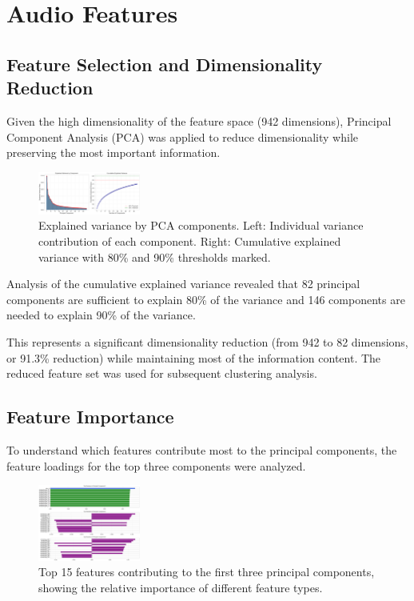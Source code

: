 \documentclass{article}
\begin{document}
\section{Audio Features}
\label{sec:audio_features}

\subsection{Feature Selection and Dimensionality Reduction}

Given the high dimensionality of the feature space (942 dimensions), Principal Component Analysis (PCA) was applied to reduce dimensionality while preserving the most important information.

\begin{figure}[H]
  \centering
  \includegraphics[width=0.3\textwidth]{figures/audio_features/pca_explained_variance.png}
  \caption{Explained variance by PCA components. Left: Individual variance contribution of each component. Right: Cumulative explained variance with 80\% and 90\% thresholds marked.}
  \label{fig:pca_variance}
\end{figure}

Analysis of the cumulative explained variance revealed that 82 principal components are sufficient to explain 80\% of the variance and 146 components are needed to explain 90\% of the variance.

This represents a significant dimensionality reduction (from 942 to 82 dimensions, or 91.3\% reduction) while maintaining most of the information content. The reduced feature set was used for subsequent clustering analysis.

\subsection{Feature Importance}

To understand which features contribute most to the principal components, the feature loadings for the top three components were analyzed.

\begin{figure}[H]
  \centering
  \includegraphics[width=0.3\textwidth]{figures/audio_features/feature_importance.png}
  \caption{Top 15 features contributing to the first three principal components, showing the relative importance of different feature types.}
  \label{fig:feature_importance}
\end{figure}
\end{document}
